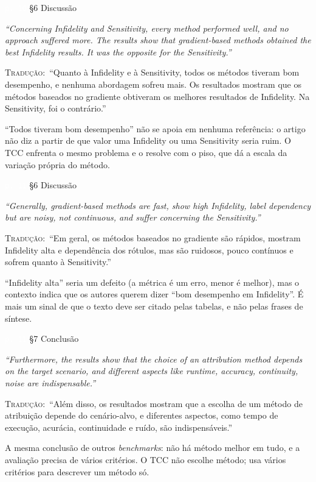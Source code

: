 \documentclass[11pt,a4paper]{article}
\newcommand{\pagechip}[1]{{\setlength{\fboxsep}{1.5pt}\colorbox{cAcc}{\textcolor{white}{\scriptsize\texttt{#1}}}}}
\newenvironment{origquote}{\par\itshape\small}{\par}
\newenvironment{tradquote}{\par\small\textsc{Tradução:}\ }{\par}
\newcommand{\explab}[1]{\par\smallskip{\small\color{cAcc}\textbf{\MakeUppercase{#1}}}\par}
\begin{document}
\begin{citacard}{\pagechip{p. 10} §6 Discussão}
\begin{origquote}“Concerning Infidelity and Sensitivity, every method performed well, and no approach suffered more. The results show that gradient-based methods obtained the best Infidelity results. It was the opposite for the Sensitivity.”\end{origquote}
\begin{tradquote}“Quanto à Infidelity e à Sensitivity, todos os métodos tiveram bom desempenho, e nenhuma abordagem sofreu mais. Os resultados mostram que os métodos baseados no gradiente obtiveram os melhores resultados de Infidelity. Na Sensitivity, foi o contrário.”\end{tradquote}
\explab{Explicação}
``Todos tiveram bom desempenho'' não se apoia em nenhuma referência: o artigo não diz a partir de que valor uma Infidelity ou uma Sensitivity seria ruim. O TCC enfrenta o mesmo problema e o resolve com o piso, que dá a escala da variação própria do método.
\end{citacard}

\begin{citacard}{\pagechip{p. 11} §6 Discussão}
\begin{origquote}“Generally, gradient-based methods are fast, show high Infidelity, label dependency but are noisy, not continuous, and suffer concerning the Sensitivity.”\end{origquote}
\begin{tradquote}“Em geral, os métodos baseados no gradiente são rápidos, mostram Infidelity alta e dependência dos rótulos, mas são ruidosos, pouco contínuos e sofrem quanto à Sensitivity.”\end{tradquote}
\explab{Explicação}
``Infidelity alta'' seria um defeito (a métrica é um erro, menor é melhor), mas o contexto indica que os autores querem dizer ``bom desempenho em Infidelity''. É mais um sinal de que o texto deve ser citado pelas tabelas, e não pelas frases de síntese.
\end{citacard}

\begin{citacard}{\pagechip{p. 11} §7 Conclusão}
\begin{origquote}“Furthermore, the results show that the choice of an attribution method depends on the target scenario, and different aspects like runtime, accuracy, continuity, noise are indispensable.”\end{origquote}
\begin{tradquote}“Além disso, os resultados mostram que a escolha de um método de atribuição depende do cenário-alvo, e diferentes aspectos, como tempo de execução, acurácia, continuidade e ruído, são indispensáveis.”\end{tradquote}
\explab{Explicação}
A mesma conclusão de outros \textit{benchmarks}: não há método melhor em tudo, e a avaliação precisa de vários critérios. O TCC não escolhe método; usa vários critérios para descrever um método só.
\end{citacard}
\end{document}
